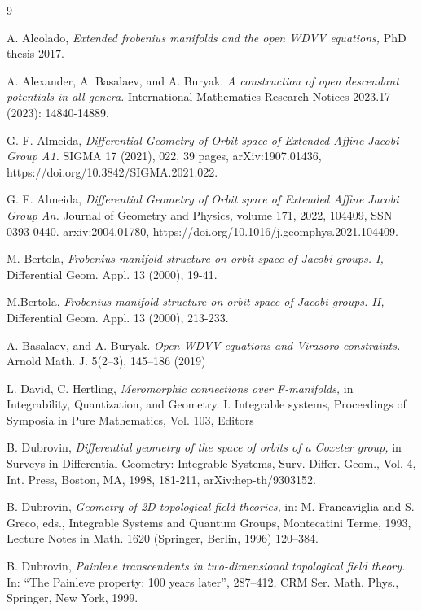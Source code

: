 \documentclass{article}
\theoremstyle{definition}
\begin{document}
\begin{thebibliography}{9}


A. Alcolado,
\textit{Extended frobenius manifolds and the open WDVV equations,}
PhD thesis 2017.

A. Alexander, A. Basalaev, and A. Buryak.
\textit{ A construction of open descendant potentials in all genera.}
 International Mathematics Research Notices 2023.17 (2023): 14840-14889.
 
G. F. Almeida, 
\textit{Differential Geometry of Orbit space of Extended Affine Jacobi Group A1.}
 SIGMA 17 (2021), 022, 39 pages, arXiv:1907.01436, https://doi.org/10.3842/SIGMA.2021.022.

G. F. Almeida, 
\textit{Differential Geometry of Orbit space of Extended Affine Jacobi Group An.}
 Journal of Geometry and Physics, volume 171, 2022, 104409, SSN 0393-0440. arxiv:2004.01780, https://doi.org/10.1016/j.geomphys.2021.104409.
 
M. Bertola, 
\textit{Frobenius manifold structure on orbit space of Jacobi groups. I,}
Differential Geom. Appl. 13 (2000), 19-41.

M.Bertola, 
\textit{Frobenius manifold structure on orbit space of Jacobi groups. II,}
 Differential Geom. Appl. 13 (2000), 213-233.
 
A. Basalaev, and A. Buryak.
  \textit{Open WDVV equations and Virasoro constraints. }
  Arnold Math. J. 5(2–3), 145–186 (2019)

 L. David, C. Hertling,
 \textit{  Meromorphic connections over F-manifolds,}
  in Integrability, Quantization, and Geometry. I. Integrable systems, Proceedings of Symposia in Pure Mathematics, Vol. 103, Editors
  
B. Dubrovin, 
\textit{Differential geometry of the space of orbits of a Coxeter group,}
 in Surveys in Differential Geometry: Integrable Systems, Surv. Differ. Geom., Vol. 4, Int. Press, Boston, MA, 1998, 181-211, arXiv:hep-th/9303152.

B. Dubrovin,
\textit{Geometry of 2D topological field theories,}
in: M. Francaviglia and S. Greco, eds., Integrable
Systems and Quantum Groups, Montecatini Terme, 1993, Lecture Notes in Math. 1620 (Springer, Berlin, 1996)
120–384.

B. Dubrovin,
\textit{Painleve transcendents in two-dimensional topological field theory.}
 In: “The Painleve property: 100 years later”, 287–412, CRM Ser. Math. Phys., Springer, New York, 1999.
 

\end{thebibliography}
\end{document}
